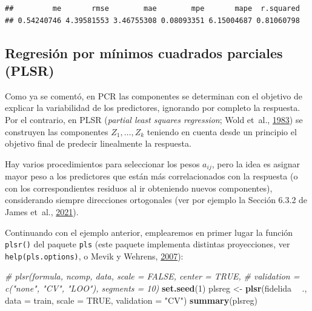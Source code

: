 \documentclass[
  spanish,
]{book}
\newenvironment{Shaded}{\begin{snugshade}}{\end{snugshade}}
\newcommand{\CommentTok}[1]{\textcolor[rgb]{0.56,0.35,0.01}{\textit{#1}}}
\newcommand{\DataTypeTok}[1]{\textcolor[rgb]{0.13,0.29,0.53}{#1}}
\newcommand{\DecValTok}[1]{\textcolor[rgb]{0.00,0.00,0.81}{#1}}
\newcommand{\KeywordTok}[1]{\textcolor[rgb]{0.13,0.29,0.53}{\textbf{#1}}}
\newcommand{\NormalTok}[1]{#1}
\newcommand{\OperatorTok}[1]{\textcolor[rgb]{0.81,0.36,0.00}{\textbf{#1}}}
\newcommand{\OtherTok}[1]{\textcolor[rgb]{0.56,0.35,0.01}{#1}}
\newcommand{\StringTok}[1]{\textcolor[rgb]{0.31,0.60,0.02}{#1}}
\theoremstyle{break}
\theoremstyle{definition}
\theoremstyle{definition}
\theoremstyle{definition}
\theoremstyle{remark}
\begin{document}
\begin{verbatim}
##         me       rmse        mae        mpe       mape  r.squared 
## 0.54240746 4.39581553 3.46755308 0.08093351 6.15004687 0.81060798
\end{verbatim}

\hypertarget{regresiuxf3n-por-muxednimos-cuadrados-parciales-plsr}{%
\subsection{Regresión por mínimos cuadrados parciales (PLSR)}\label{regresiuxf3n-por-muxednimos-cuadrados-parciales-plsr}}

Como ya se comentó, en PCR las componentes se determinan con el objetivo de explicar la variabilidad de los predictores, ignorando por completo la respuesta.
Por el contrario, en PLSR (\emph{partial least squares regression}; Wold et~al., \protect\hyperlink{ref-wold1983multivariate}{1983}) se construyen las componentes \(Z_1, \ldots, Z_k\) teniendo en cuenta desde un principio el objetivo final de predecir linealmente la respuesta.

Hay varios procedimientos para seleccionar los pesos \(a_{ij}\), pero la idea es asignar mayor peso a los predictores que están más correlacionados con la respuesta (o con los correspondientes residuos al ir obteniendo nuevos componentes), considerando siempre direcciones ortogonales (ver por ejemplo la Sección 6.3.2 de James et~al., \protect\hyperlink{ref-james2021introduction}{2021}).

Continuando con el ejemplo anterior, emplearemos en primer lugar la función \texttt{plsr()} del paquete \texttt{pls} (este paquete implementa distintas proyecciones, ver \texttt{help(pls.options)}, o Mevik y Wehrens, \protect\hyperlink{ref-Mevik2007pls}{2007}):

\begin{Shaded}
\begin{Highlighting}[]
\CommentTok{# plsr(formula, ncomp, data, scale = FALSE, center = TRUE, }
\CommentTok{#      validation = c("none", "CV", "LOO"), segments = 10)}
\KeywordTok{set.seed}\NormalTok{(}\DecValTok{1}\NormalTok{)}
\NormalTok{plsreg <-}\StringTok{ }\KeywordTok{plsr}\NormalTok{(fidelida }\OperatorTok{~}\StringTok{ }\NormalTok{., }\DataTypeTok{data =}\NormalTok{ train, }\DataTypeTok{scale =} \OtherTok{TRUE}\NormalTok{, }\DataTypeTok{validation =} \StringTok{"CV"}\NormalTok{)}
\KeywordTok{summary}\NormalTok{(plsreg)}
\end{Highlighting}
\end{Shaded}
\end{document}
